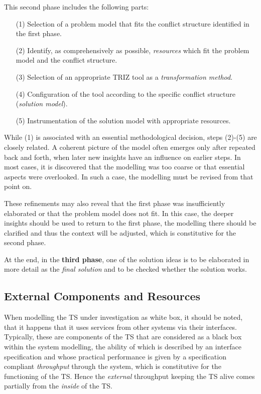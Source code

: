\documentclass[11pt,a4paper]{article}
\begin{document}
This second phase includes the following parts:
\begin{itemize}[noitemsep]
\item[(1)] Selection of a problem model that fits the conflict structure
  identified in the first phase.
\item [(2)] Identify, as comprehensively as possible, \emph{resources} which
  fit the problem model and the conflict structure.
\item [(3)] Selection of an appropriate TRIZ tool as a \emph{transformation
  method}.
\item [(4)] Configuration of the tool according to the specific
  conflict structure (\emph{solution model}).
\item [(5)] Instrumentation of the solution model with appropriate resources.
\end{itemize}
While (1) is associated with an essential methodological decision, steps
(2)-(5) are closely related. A coherent picture of the model often emerges
only after repeated back and forth, when later new insights have an influence
on earlier steps.  In most cases, it is discovered that the modelling was too
coarse or that essential aspects were overlooked. In such a case, the
modelling must be revised from that point on.

These refinements may also reveal that the first phase was insufficiently
elaborated or that the problem model does not fit.  In this case, the deeper
insights should be used to return to the first phase, the modelling there
should be clarified and thus the context will be adjusted, which is
constitutive for the second phase.  

At the end, in the \textbf{third phase}, one of the solution ideas is to be
elaborated in more detail as the \emph{final solution} and to be checked
whether the solution works.

\subsection*{External Components and Resources}

When modelling the TS under investigation as white box, it should be noted,
that it happens that it uses services from other systems via their interfaces.
Typically, these are components of the TS that are considered as a black box
within the system modelling, the ability of which is described by an interface
specification and whose practical performance is given by a specification
compliant \emph{throughput} through the system, which is constitutive for the
functioning of the TS. Hence the \emph{external} throughput keeping the TS
alive comes partially from the \emph{inside} of the TS.
\end{document}
